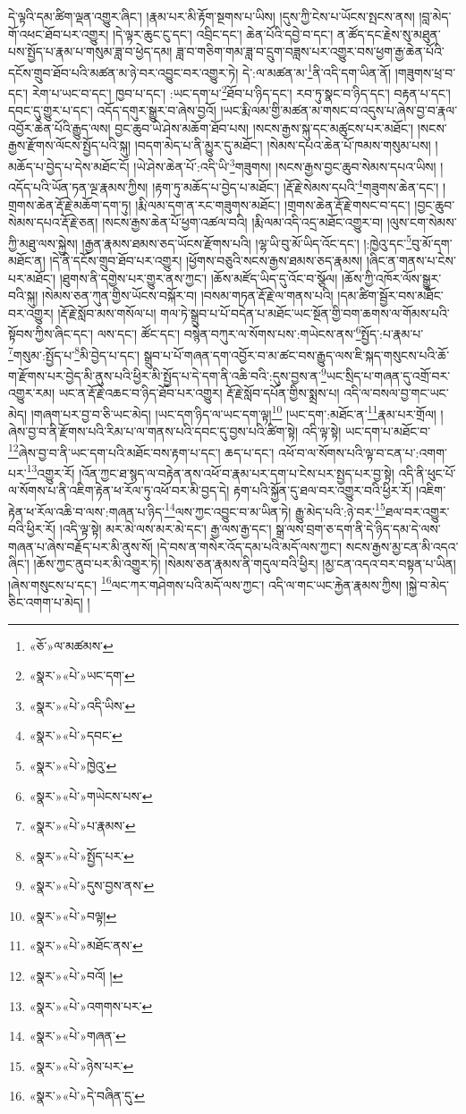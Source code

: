 དེ་ལྟའི་དམ་ཚིག་ལྡན་འགྱུར་ཞིང་། །རྣམ་པར་མི་རྟོག་སྔགས་པ་ཡིས། །དུས་ཀྱི་ངེས་པ་ཡོངས་སྤངས་ནས། །བླ་མེད་གོ་འཕང་ཐོབ་པར་འགྱུར། །དེ་ལྟར་ཆུང་ངུ་དང་། འབྲིང་དང་། ཆེན་པོའི་དབྱེ་བ་དང་། ན་ཚོད་དང་རྗེས་སུ་མཐུན་པས་སྤྱོད་པ་རྣམ་པ་གསུམ་ཟླ་བ་ཕྱེད་དམ། ཟླ་བ་གཅིག་གམ་ཟླ་བ་དྲུག་བཟླས་པར་འགྱུར་བས་ཕྱག་རྒྱ་ཆེན་པོའི་དངོས་གྲུབ་ཐོབ་པའི་མཚན་མ་ཉེ་བར་འབྱུང་བར་འགྱུར་ཏེ། དེ་:ལ་མཚན་མ་\footnote{«ཅོ་»ལ་མཚམས་}ནི་འདི་དག་ཡིན་ནོ། །གཟུགས་ཕྲ་བ་དང་། རེག་པ་ཡང་བ་དང་། ཁྱབ་པ་དང་། :ཡང་དག་པ་\footnote{«སྣར་»«པེ་»ཡང་དག་}ཐོབ་པ་ཉིད་དང་། རབ་ཏུ་སྣང་བ་ཉིད་དང་། བརྟན་པ་དང་། དབང་དུ་གྱུར་པ་དང་། འདོད་དགུར་སྒྱུར་བ་ཞེས་བྱའོ། །ཡང་རྨི་ལམ་གྱི་མཚན་མ་གསང་བ་འདུས་པ་ཞེས་བྱ་བ་རྣལ་འབྱོར་ཆེན་པོའི་རྒྱུད་ལས། བྱང་ཆུབ་ཡེ་ཤེས་མཆོག་ཐོབ་པས། །སངས་རྒྱས་སྐུ་དང་མཚུངས་པར་མཐོང་། །སངས་རྒྱས་རྫོགས་ལོངས་སྤྱོད་པའི་སྐུ། །བདག་མེད་པ་ནི་མྱུར་དུ་མཐོང་། །སེམས་དཔའ་ཆེན་པོ་ཁམས་གསུམ་པས། །མཆོད་པ་བྱེད་པ་དེས་མཐོང་ངོ། །ཡེ་ཤེས་ཆེན་པོ་:འདི་ཡི་\footnote{«སྣར་»«པེ་»འདི་ཡིས་}གཟུགས། །སངས་རྒྱས་བྱང་ཆུབ་སེམས་དཔའ་ཡིས། །འདོད་པའི་ཡོན་ཏན་ལྔ་རྣམས་ཀྱིས། །རྟག་ཏུ་མཆོད་པ་བྱེད་པ་མཐོང་། །རྡོ་རྗེ་སེམས་དཔའི་\footnote{«སྣར་»«པེ་»དབང་}གཟུགས་ཆེན་དང་། །གྲགས་ཆེན་རྡོ་རྗེ་མཆོག་དག་ཏུ། །རྨི་ལམ་དག་ན་རང་གཟུགས་མཐོང་། །གྲགས་ཆེན་རྡོ་རྗེ་གསང་བ་དང་། །བྱང་ཆུབ་སེམས་དཔའ་རྡོ་རྗེ་ཅན། །སངས་རྒྱས་ཆེན་པོ་ཕྱག་འཚལ་བའི། །རྨི་ལམ་འདི་འདྲ་མཐོང་འགྱུར་བ། །ལུས་ངག་སེམས་ཀྱི་མཐུ་ལས་སྐྱེས། །རྒྱན་རྣམས་ཐམས་ཅད་ཡོངས་རྫོགས་པའི། །ལྷ་ཡི་བུ་མོ་ཡིད་འོང་དང་། །:ཁྱེའུ་དང་\footnote{«སྣར་»«པེ་»ཁྱེའུ་}བུ་མོ་དག་མཐོང་ན། །དེ་ནི་དངོས་གྲུབ་ཐོབ་པར་འགྱུར། །ཕྱོགས་བཅུའི་སངས་རྒྱས་ཐམས་ཅད་རྣམས། །ཞིང་ན་གནས་པ་ངེས་པར་མཐོང་། །ཐུགས་ནི་དགྱེས་པར་གྱུར་ནས་ཀྱང་། །ཆོས་མཛོད་ཡིད་དུ་འོང་བ་སྩོལ། །ཆོས་ཀྱི་འཁོར་ལོས་སྒྱུར་བའི་སྐུ། །སེམས་ཅན་ཀུན་གྱིས་ཡོངས་བསྐོར་བ། །བསམ་གཏན་རྡོ་རྗེ་ལ་གནས་པའི། །དམ་ཚིག་སྦྱོར་བས་མཐོང་བར་འགྱུར། །རྡོ་རྗེ་སློབ་མས་གསོལ་པ། གལ་ཏེ་སྒྲུབ་པ་པོ་བདེན་པ་མཐོང་ཡང་སྔོན་གྱི་བག་ཆགས་ལ་གོམས་པའི་སྟོབས་ཀྱིས་ཞིང་དང་། ལས་དང་། ཚོང་དང་། བསྙེན་བཀུར་ལ་སོགས་པས་:གཡེངས་ནས་\footnote{«སྣར་»«པེ་»གཡེངས་པས་}སྤྱོད་:པ་རྣམ་པ་\footnote{«སྣར་»«པེ་»པ་རྣམས་}གསུམ་:སྤྱོད་པ་\footnote{«སྣར་»«པེ་»སྤྱོད་པར་}མི་བྱེད་པ་དང་། སྒྲུབ་པ་པོ་གཞན་དག་འབྱོར་བ་མ་ཚང་བས་རྒྱུད་ལས་ཇི་སྐད་གསུངས་པའི་ཆོ་ག་རྫོགས་པར་བྱེད་མི་ནུས་པའི་ཕྱིར་མི་སྤྱོད་པ་དེ་དག་ནི་འཆི་བའི་:དུས་བྱས་ན་\footnote{«སྣར་»«པེ་»དུས་བྱས་ནས་}ཡང་སྲིད་པ་གཞན་དུ་འགྲོ་བར་འགྱུར་རམ། ཡང་ན་རྡོ་རྗེ་འཆང་བ་ཉིད་ཐོབ་པར་འགྱུར། རྡོ་རྗེ་སློབ་དཔོན་གྱིས་སྨྲས་པ། འདི་ལ་བསལ་བྱ་གང་ཡང་མེད། །གཞག་པར་བྱ་བ་ཅི་ཡང་མེད། །ཡང་དག་ཉིད་ལ་ཡང་དག་ལྟ།\footnote{«སྣར་»«པེ་»བལྟ།} །ཡང་དག་:མཐོང་ན་\footnote{«སྣར་»«པེ་»མཐོང་ནས་}རྣམ་པར་གྲོལ། །ཞེས་བྱ་བ་ནི་རྫོགས་པའི་རིམ་པ་ལ་གནས་པའི་དབང་དུ་བྱས་པའི་ཚིག་སྟེ། འདི་ལྟ་སྟེ། ཡང་དག་པ་མཐོང་བ་\footnote{«སྣར་»«པེ་»བའོ། །}ཞེས་བྱ་བ་ནི་ཡང་དག་པའི་མཐོང་བས་རྟག་པ་དང་། ཆད་པ་དང་། འཕོ་བ་ལ་སོགས་པའི་ལྟ་བ་ངན་པ་:འགག་པར་\footnote{«སྣར་»«པེ་»འགགས་པར་}འགྱུར་རོ། །འོན་ཀྱང་ཐ་སྙད་ལ་བརྟེན་ནས་འཕོ་བ་རྣམ་པར་དག་པ་ངེས་པར་སྤྱད་པར་བྱ་སྟེ། འདི་ནི་ཕུང་པོ་ལ་སོགས་པ་ནི་འཇིག་རྟེན་ཕ་རོལ་ཏུ་འཕོ་བར་མི་བྱད་དེ། རྟག་པའི་སྐྱོན་དུ་ཐལ་བར་འགྱུར་བའི་ཕྱིར་རོ། །འཇིག་རྟེན་ཕ་རོལ་འཆི་བ་ལས་:གཞན་པ་ཉིད་\footnote{«སྣར་»«པེ་»གཞན་}ལས་ཀྱང་འབྱུང་བ་མ་ཡིན་ཏེ། རྒྱུ་མེད་པའི་:ཉེ་བར་\footnote{«སྣར་»«པེ་»ཉེས་པར་}ཐལ་བར་འགྱུར་བའི་ཕྱིར་རོ། །འདི་ལྟ་སྟེ། མར་མེ་ལས་མར་མེ་དང་། རྒྱ་ལས་རྒྱ་དང་། སྒྲ་ལས་བྲག་ཅ་དག་ནི་དེ་ཉིད་དམ་དེ་ལས་གཞན་པ་ཞེས་བརྗོད་པར་མི་ནུས་སོ། །དེ་བས་ན་གསེར་འོད་དམ་པའི་མདོ་ལས་ཀྱང་། སངས་རྒྱས་མྱ་ངན་མི་འདའ་ཞིང་། །ཆོས་ཀྱང་ནུབ་པར་མི་འགྱུར་ཏེ། །སེམས་ཅན་རྣམས་ནི་གདུལ་བའི་ཕྱིར། །མྱ་ངན་འདའ་བར་བསྟན་པ་ཡིན། །ཞེས་གསུངས་པ་དང་། \footnote{«སྣར་»«པེ་»དེ་བཞིན་དུ་}ལང་ཀར་གཤེགས་པའི་མདོ་ལས་ཀྱང་། འདི་ལ་གང་ཡང་རྐྱེན་རྣམས་ཀྱིས། །སྐྱེ་བ་མེད་ཅིང་འགག་པ་མེད། །
